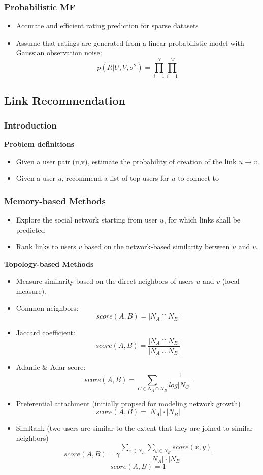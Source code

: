 \documentclass[../notes.tex]{subfiles}
\begin{document}
\subsubsection{Probabilistic MF}
\begin{itemize}
  \item Accurate and efficient rating prediction for sparse datasets
  \item Assume that ratings are generated from a linear probabilistic model with Gaussian observation noise:
  $$p(R|U,V,\sigma^2) = \prod_{i=1}^{N} \prod_{i=1}^{M}$$
\end{itemize}

\subsection{Link Recommendation}
\subsubsection{Introduction}

\textbf{Problem definitions}
\begin{itemize}
  \item Given a user pair (u,v), estimate the probability of creation of the link $u \rightarrow v$.
  \item Given a user $u$, recommend a list of top users for $u$ to connect to
\end{itemize}

\subsubsection{Memory-based Methods}
\begin{itemize}
  \item Explore the social network starting from user $u$, for which links shall be predicted
  \item Rank links to users $v$ based on the network-based similarity between $u$ and $v$.
\end{itemize}

\textbf{Topology-based Methods}
\begin{itemize}
  \item Measure similarity based on the direct neighbors of users $u$ and $v$ (local measure).
  \item Common neighbors: $$score(A,B) = |N_A \cap N_B|$$
  \item Jaccard coefficient: $$score(A, B) = \frac{|N_A \cap N_B|}{|N_A \cup N_B|}$$
  \item Adamic \& Adar score: $$score(A,B) = \sum_{C \in N_A \cap N_B} \frac{1}{log|N_C|}$$
  \item Preferential attachment (initially propsed for modeling network growth) $$score(A,B) = |N_A|\cdot|N_B|$$
  \item SimRank (two users are similar to the extent that they are joined to similar neighbors)
  $$score(A,B) = \gamma \frac{\sum_{x \in N_A} \sum_{y \in N_B} score(x, y)}{|N_A| \cdot |N_B|}$$
  $$score(A,B) = 1$$
\end{itemize}
\end{document}
